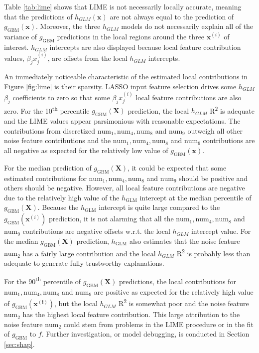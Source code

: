 \documentclass[11pt]{asaproc}
\begin{document}
Table \ref{tab:lime} shows that LIME is not necessarily locally accurate, meaning that the predictions of $h_{GLM}(\mathbf{x})$ are not always equal to the prediction of $g_{\text{GBM}}(\mathbf{x})$. Moreover, the three $h_{GLM}$ models do not necessarily explain all of the variance of $g_{\text{GBM}}$ predictions in the local regions around the three $\mathbf{x}^{(i)}$ of interest. $h_{GLM}$ intercepts are also displayed because local feature contribution values, $\beta_j x_j^{(i)}$, are offsets from the local $h_{GLM}$ intercepts.

An immediately noticeable characteristic of the estimated local contributions in Figure \ref{fig:lime} is their sparsity. LASSO input feature selection drives some $h_{GLM}$ $\beta_j$ coefficients to zero so that some $\beta_j x_j^{(i)}$ local feature contributions are also zero. For the 10\textsuperscript{th} percentile $g_{\text{GBM}}(\mathbf{X})$ prediction, the local $h_{GLM}$ R\textsuperscript{2} is adequate and the LIME values appear parsimonious with reasonable expectations. The contributions from discretized $\text{num}_1, \text{num}_4, \text{num}_8$ and $\text{num}_9$ outweigh all other noise feature contributions and the $\text{num}_1, \text{num}_4, \text{num}_8$ and $\text{num}_9$ contributions are all negative as expected for the relatively low value of $g_{\text{GBM}}(\mathbf{x})$. 

For the median prediction of $g_{\text{GBM}}(\mathbf{X})$, it could be expected that some estimated contributions for $\text{num}_1, \text{num}_4, \text{num}_8$ and $\text{num}_9$ should be positive and others should be negative. However, all local feature contributions are negative due to the relatively high value of the $h_{\text{GLM}}$ intercept at the median percentile of $g_{\text{GBM}}(\mathbf{X})$. Because the $h_{\text{GLM}}$ intercept is quite large compared to the $g_{\text{GBM}}(\mathbf{x}^{(i)})$ prediction, it is not alarming that all the $\text{num}_1, \text{num}_4, \text{num}_8$ and $\text{num}_9$ contributions are negative offsets w.r.t. the local $h_{GLM}$ intercept value. For the median $g_{\text{GBM}}(\mathbf{X})$ prediction, $h_{\text{GLM}}$ also estimates that the noise feature $\text{num}_2$ has a fairly large contribution and the local $h_{GLM}$ R\textsuperscript{2} is probably less than adequate to generate fully trustworthy explanations.

For the 90\textsuperscript{th} percentile of $g_{\text{GBM}}(\mathbf{X})$ predictions, the local contributions for $\text{num}_1, \text{num}_4, \text{num}_8$ and $\text{num}_9$ are positive as expected for the relatively high value of $g_{\text{GBM}}(\mathbf{x^{(i)}})$, but the local $h_{GLM}$ R\textsuperscript{2} is somewhat poor and the noise feature $\text{num}_2$ has the highest local feature contribution. This large attribution to the noise feature $\text{num}_2$ could stem from problems in the LIME procedure or in the fit of $g_{\text{GBM}}$ to $f$. Further investigation, or model debugging, is conducted in Section \ref{sec:shap}.
\end{document}
